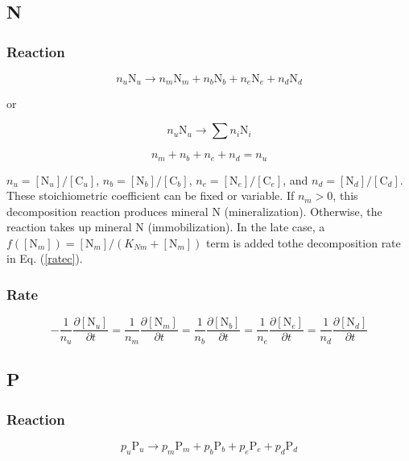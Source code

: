 \documentclass[12pt, a4paper]{article}
\begin{document}
\subsection{N}
\subsubsection{Reaction}
\begin{equation}
n_u \text{N}_u \rightarrow n_m \text{N}_m + n_b \text{N}_b + n_e \text{N}_e + n_d \text{N}_d
\end{equation}

or

\begin{equation}
n_u \text{N}_u \rightarrow \sum n_i \text{N}_i
\end{equation}

\begin{equation}
n_m + n_b + n_e + n_d = n_u
\end{equation}

$n_u = [\text{N}_u]/[\text{C}_u]$, $n_b = [\text{N}_b]/[\text{C}_b]$, $n_e = [\text{N}_e]/[\text{C}_e]$, and $n_d = [\text{N}_d]/[\text{C}_d]$. These stoichiometric coefficient can be fixed or variable. If $n_m > 0$, this decomposition reaction produces mineral N (mineralization). Otherwise, the reaction takes up mineral N (immobilization). In the late case, a $f([\text{N}_m])=[\text{N}_m]/(K_{Nm}+[\text{N}_m])$ term is added tothe decomposition rate in Eq. (\ref{ratec}).
\subsubsection{Rate}
\begin{equation}
-\frac{1}{n_u}\frac{\partial [\text{N}_u]}{\partial t} = \frac{1}{n_m}\frac{\partial [\text{N}_m]}{\partial t} = \frac{1}{n_b} \frac{\partial [\text{N}_b]}{\partial t} = \frac{1}{n_e} \frac{\partial [\text{N}_e]}{\partial t} = \frac{1}{n_d}\frac{\partial [\text{N}_d]}{\partial t}
\end{equation}

\subsection{P}
\subsubsection{Reaction}
\begin{equation}
p_u \text{P}_u \rightarrow p_m \text{P}_m + p_b \text{P}_b + p_e \text{P}_e + p_d \text{P}_d
\end{equation}
\end{document}
